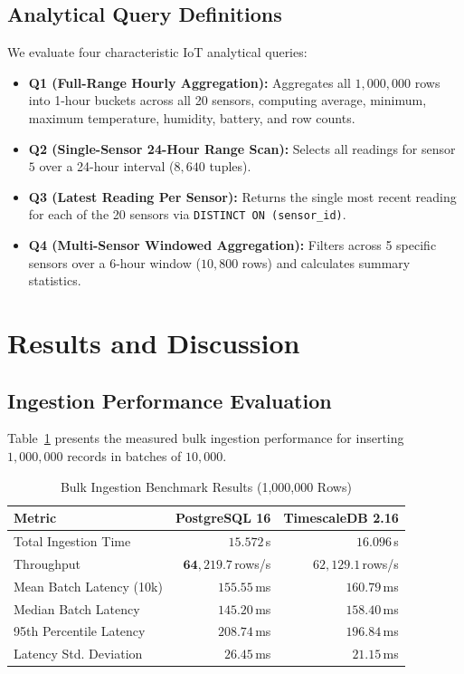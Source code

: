 \documentclass[conference,a4paper]{IEEEtran}
\begin{document}
\subsection{Analytical Query Definitions}
We evaluate four characteristic IoT analytical queries:
\begin{itemize}
    \item \textbf{Q1 (Full-Range Hourly Aggregation):} Aggregates all $1,000,000$ rows into 1-hour buckets across all 20 sensors, computing average, minimum, maximum temperature, humidity, battery, and row counts.
    \item \textbf{Q2 (Single-Sensor 24-Hour Range Scan):} Selects all readings for sensor $5$ over a 24-hour interval ($8,640$ tuples).
    \item \textbf{Q3 (Latest Reading Per Sensor):} Returns the single most recent reading for each of the 20 sensors via \texttt{DISTINCT ON (sensor\_id)}.
    \item \textbf{Q4 (Multi-Sensor Windowed Aggregation):} Filters across 5 specific sensors over a 6-hour window ($10,800$ rows) and calculates summary statistics.
\end{itemize}

\section{Results and Discussion}

\subsection{Ingestion Performance Evaluation}
Table~\ref{tab:ingest_results} presents the measured bulk ingestion performance for inserting $1,000,000$ records in batches of $10,000$.

\begin{table}[h]
\centering
\caption{Bulk Ingestion Benchmark Results (1,000,000 Rows)}
\label{tab:ingest_results}
\footnotesize
\begin{tabular}{@{}lrr@{}}
\toprule
\textbf{Metric} & \textbf{PostgreSQL 16} & \textbf{TimescaleDB 2.16} \\
\midrule
Total Ingestion Time & $15.572$\,s & $16.096$\,s \\
Throughput & $\mathbf{64,219.7}$\,rows/s & $62,129.1$\,rows/s \\
Mean Batch Latency (10k) & $\mathbf{155.55}$\,ms & $160.79$\,ms \\
Median Batch Latency & $\mathbf{145.20}$\,ms & $158.40$\,ms \\
95th Percentile Latency & $208.74$\,ms & $\mathbf{196.84}$\,ms \\
Latency Std. Deviation & $26.45$\,ms & $\mathbf{21.15}$\,ms \\
\bottomrule
\end{tabular}
\end{table}
\end{document}
